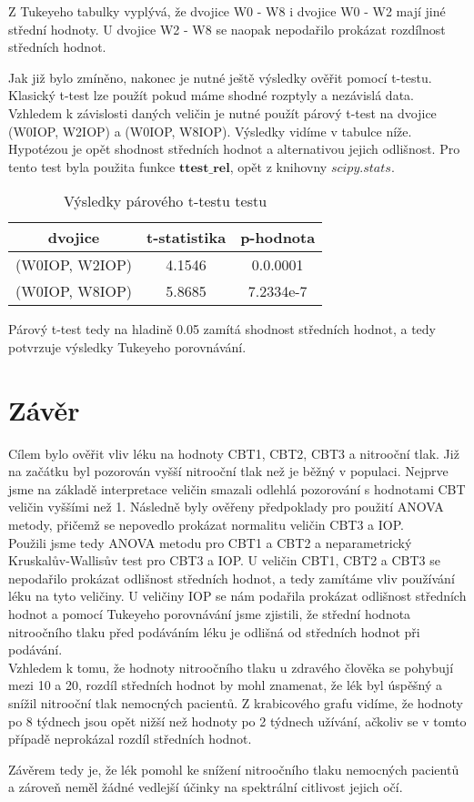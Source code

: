 \documentclass{article}
\begin{document}
Z Tukeyeho tabulky vyplývá, že dvojice W0 - W8 i dvojice W0 - W2 mají jiné střední hodnoty.
U dvojice W2 - W8 se naopak nepodařilo prokázat rozdílnost středních hodnot.

Jak již bylo zmíněno, nakonec je nutné ještě výsledky ověřit pomocí t-testu.
Klasický t-test lze použít pokud máme shodné rozptyly a nezávislá data.
Vzhledem k závislosti daných veličin je nutné použít párový t-test na  dvojice (W0IOP, W2IOP) a (W0IOP, W8IOP).
Výsledky vidíme v tabulce níže.
Hypotézou je opět shodnost středních hodnot a alternativou jejich odlišnost.
Pro tento test byla použita funkce $\mathbf{ttest\_rel}$, opět z knihovny $scipy.stats$.

\begin{table}[H]
  \small
  \centering
  \caption{Výsledky párového t-testu testu}
  \begin{tabular}{|ccc|}
    \hline
    dvojice & t-statistika & p-hodnota\\
    \hline
    (W0IOP, W2IOP) & 4.1546 & 0.0.0001\\
    (W0IOP, W8IOP) & 5.8685 & 7.2334e-7\\
    \hline
  \end{tabular}
\end{table}

Párový t-test tedy na hladině 0.05 zamítá shodnost středních hodnot, a tedy potvrzuje výsledky Tukeyeho porovnávání.

\newpage
\section{Závěr}
Cílem bylo ověřit vliv léku na hodnoty CBT1, CBT2, CBT3 a nitrooční tlak.
Již na začátku byl pozorován vyšší nitrooční tlak než je běžný v populaci.
Nejprve jsme na základě interpretace veličin smazali odlehlá pozorování s hodnotami CBT veličin vyššími než 1.
Následně byly ověřeny předpoklady pro použití ANOVA metody, přičemž se nepovedlo prokázat normalitu veličin CBT3 a IOP.\\
Použili jsme tedy ANOVA metodu pro CBT1 a CBT2 a neparametrický Kruskalův-Wallisův test pro CBT3 a IOP.
U veličin CBT1, CBT2 a CBT3 se nepodařilo prokázat odlišnost středních hodnot, a tedy zamítáme vliv používání léku na tyto veličiny.
U veličiny IOP se nám podařila prokázat odlišnost středních hodnot a pomocí Tukeyeho porovnávání jsme zjistili, že střední hodnota nitroočního tlaku před podáváním léku
je odlišná od středních hodnot při podávání.\\
Vzhledem k tomu, že hodnoty nitroočního tlaku u zdravého člověka se pohybují mezi 10 a 20, rozdíl středních hodnot by mohl znamenat, že lék byl úspěšný a snížil nitrooční tlak nemocných pacientů.
Z krabicového grafu vidíme, že hodnoty po 8 týdnech jsou opět nižší než hodnoty po 2 týdnech užívání, ačkoliv se v tomto případě neprokázal rozdíl středních hodnot.

Závěrem tedy je, že lék pomohl ke snížení nitroočního tlaku nemocných pacientů a zároveň neměl žádné vedlejší účinky na spektrální citlivost jejich očí.
\end{document}
